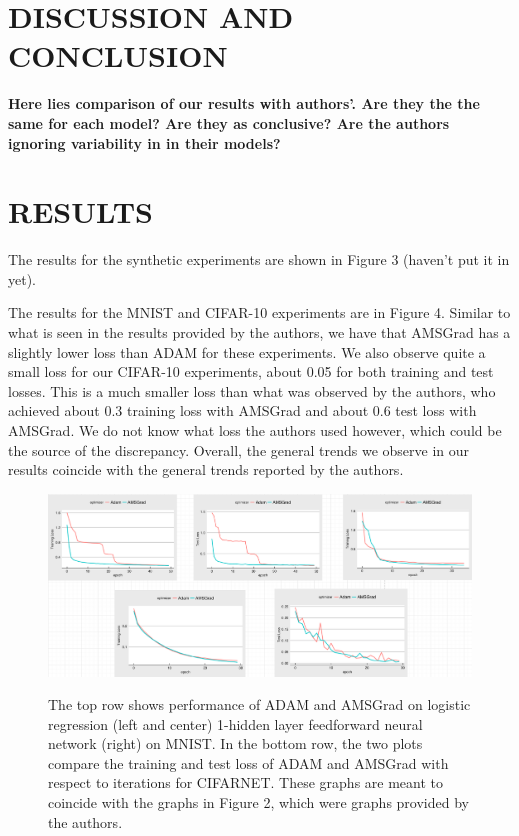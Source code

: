 \documentclass[letterpaper, 10 pt, conference]{ieeeconf}  %
\begin{document}
\section{DISCUSSION AND CONCLUSION}

\textbf{Here lies comparison of our results with authors'. Are they the the same for each model? Are they as conclusive? Are the authors ignoring variability in in their models? }



\section{RESULTS}

The results for the synthetic experiments are shown in Figure 3 (haven't put it in yet). \par
The results for the MNIST and CIFAR-10 experiments are in Figure 4. Similar to what is seen in the results provided by the authors, we have that AMSGrad has a slightly lower loss than ADAM for these experiments. We also observe quite a small loss for our CIFAR-10 experiments, about 0.05 for both training and test losses. This is a much smaller loss than what was observed by the authors, who achieved about 0.3 training loss with AMSGrad and about 0.6 test loss with AMSGrad. We do not know what loss the authors used however, which could be the source of the discrepancy. Overall, the general trends we observe in our results coincide with the general trends reported by the authors. 

\begin{figure}[]
\centering
\begin{minipage}{0.9\textwidth}
  \centering
  \includegraphics[width=1\linewidth]{Fig4.png}
  \label{fig:test4}
\end{minipage}%
\caption[]{The top row shows performance of ADAM and AMSGrad on logistic regression (left and center) 1-hidden layer feedforward neural network (right) on MNIST. In the bottom row, the two plots compare the training and test loss of ADAM and AMSGrad with respect to iterations for CIFARNET. These graphs are meant to coincide with the graphs in Figure 2, which were graphs provided by the authors.} 
\end{figure} 
\end{document}
